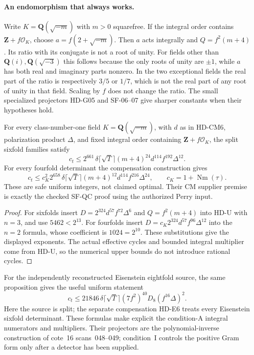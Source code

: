 \paragraph{An endomorphism that always works.}
Write $K=\mathbf Q(\sqrt{-m})$ with $m>0$ squarefree. If the
integral order contains $\mathbf Z+f\mathcal O_K$, choose
$a=f(2+\sqrt{-m})$. Then $a$ acts integrally and
$Q=f^2(m+4)$. Its ratio with its conjugate is not a root of unity.
For fields other than $\mathbf Q(i),\mathbf Q(\sqrt{-3})$ this
follows because the only roots of unity are $\pm1$, while $a$
has both real and imaginary parts nonzero. In the two exceptional
fields the real part of the ratio is respectively $3/5$ or $1/7$,
which is not the real part of any root of unity in that field.
Scaling by $f$ does not change the ratio. The small specialized
projectors HD-G05 and SF-06--07 give sharper constants when
their hypotheses hold.

\begin{corollary}
\label{HD-U6}
For every class-number-one field $K=\mathbf Q(\sqrt{-m})$,
with $d$ as in HD-CM6, polarization product $\Delta$, and fixed
integral order containing $\mathbf Z+f\mathcal O_K$, the split
sixfold families satisfy
\[
 \boxed{c_t\le 2^{661}\,
 \delta\lceil\sqrt T\rceil(m+4)^{24}d^{114}f^{192}\Delta^{12}.}
\]
For every fourfold determinant the compensation construction gives
\[
 c_t\le c_K^2 2^{658}\,
 \delta\lceil\sqrt T\rceil(m+4)^{12}d^{114}f^{216}\Delta^{24},
 \qquad c_K=1+\operatorname{Nm}(\tau).
\]
These are safe uniform integers, not claimed optimal. Their CM
supplier premise is exactly the checked SF-QC proof using the
authorized Perry input.
\end{corollary}
\begin{proof}
For sixfolds insert $D=2^{324}d^{57}f^{72}\Delta^6$ and
$Q=f^2(m+4)$ into HD-U with $n=3$, and use $5462<2^{13}$.
For fourfolds insert
$D=c_K2^{324}d^{57}f^{96}\Delta^{12}$ into the $n=2$ formula,
whose coefficient is $1024=2^{10}$. These substitutions give
the displayed exponents. The actual effective cycles and bounded
integral multiplier come from HD-U, so the numerical upper bounds
do not introduce rational cycles.
\end{proof}

For the independently reconstructed Eisenstein eightfold source,
the same proposition gives the useful uniform statement
\[
 c_t\le21846\,\delta\lceil\sqrt T\rceil
       (7f^2)^{40}D_8(f^{16}\Delta)^2.
\]
Here the source is split; the separate compensation HD-E6 treats
every Eisenstein sixfold determinant. These formulas make explicit
the condition-A integral numerators and multipliers. Their
projectors are the polynomial-inverse construction of cote~16
scans~048--049; condition~I controls the positive Gram form only
after a detector has been supplied.

